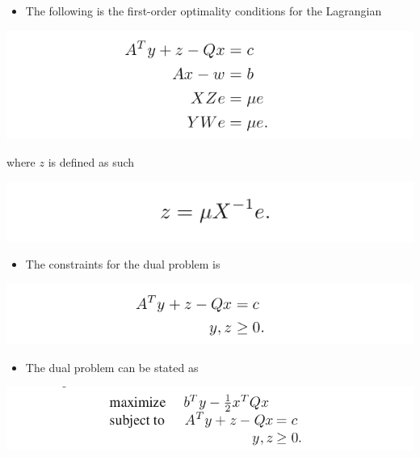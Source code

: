 \documentclass[11pt]{article}
\begin{document}
\begin{itemize}
\item The following is the first-order optimality conditions for the Lagrangian
\end{itemize}
\begin{center}
\includegraphics[width=.9\linewidth]{Quadratic Programming/screenshot_2019-03-17_15-23-06.png}
\end{center}
where \(z\) is defined as such
\begin{center}
\includegraphics[width=.9\linewidth]{Quadratic Programming/screenshot_2019-03-17_15-23-15.png}
\end{center} 

\begin{itemize}
\item The constraints for the dual problem is
\end{itemize}
\begin{center}
\includegraphics[width=.9\linewidth]{Quadratic Programming/screenshot_2019-03-17_15-24-19.png}
\end{center}

\begin{itemize}
\item The dual problem can be stated as
\end{itemize}
\begin{center}
\includegraphics[width=.9\linewidth]{Quadratic Programming/screenshot_2019-03-17_15-35-44.png}
\end{center}
\end{document}
